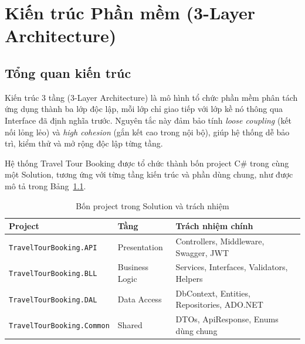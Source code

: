 
\chapter{Kiến trúc Phần mềm (3-Layer Architecture)}

\section{Tổng quan kiến trúc}\label{Sec3.1}


Kiến trúc 3 tầng (3-Layer Architecture) là mô hình tổ chức phần
mềm phân tách ứng dụng thành ba lớp độc lập, mỗi lớp chỉ giao
tiếp với lớp kề nó thông qua Interface đã định nghĩa trước.
Nguyên tắc này đảm bảo tính \textit{loose coupling} (kết nối
lỏng lẻo) và \textit{high cohesion} (gắn kết cao trong nội bộ),
giúp hệ thống dễ bảo trì, kiểm thử và mở rộng độc lập từng tầng.


Hệ thống Travel Tour Booking được tổ chức thành bốn project C\#
trong cùng một Solution, tương ứng với từng tầng kiến trúc và
phần dùng chung, như được mô tả trong Bảng~\ref{table:projects}.

\begin{table}[H]
  \begin{center}
    \begin{tabular}{|l|l|l|}
      \hline
      \textbf{Project} & \textbf{Tầng} & \textbf{Trách nhiệm chính} \\
      \hline
      \texttt{TravelTourBooking.API}
        & Presentation
        & Controllers, Middleware, Swagger, JWT \\
      \hline
      \texttt{TravelTourBooking.BLL}
        & Business Logic
        & Services, Interfaces, Validators, Helpers \\
      \hline
      \texttt{TravelTourBooking.DAL}
        & Data Access
        & DbContext, Entities, Repositories, ADO.NET \\
      \hline
      \texttt{TravelTourBooking.Common}
        & Shared
        & DTOs, ApiResponse, Enums dùng chung \\
      \hline
    \end{tabular}
  \end{center}
  \caption{Bốn project trong Solution và trách nhiệm}
  \label{table:projects}
\end{table}

